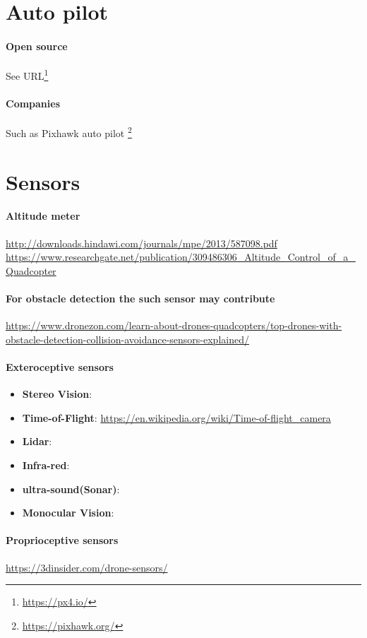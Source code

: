 \documentclass{article}
\begin{document}
	
	\section{Auto pilot}
		\paragraph{Open source } See URL\footnote{\url{https://px4.io/}}
		\paragraph{Companies}
		Such as Pixhawk auto pilot  \footnote{\url{https://pixhawk.org/}}
	\section{Sensors}
		\paragraph{Altitude meter}
		\url{http://downloads.hindawi.com/journals/mpe/2013/587098.pdf}
		\url{https://www.researchgate.net/publication/309486306_Altitude_Control_of_a_Quadcopter}
		\paragraph{For obstacle detection the such sensor may contribute}
		\url{https://www.dronezon.com/learn-about-drones-quadcopters/top-drones-with-obstacle-detection-collision-avoidance-sensors-explained/}
		\paragraph{Exteroceptive sensors}
			\begin{itemize}
				\item \textbf{Stereo Vision}:
				\item \textbf{Time-of-Flight}: \url{https://en.wikipedia.org/wiki/Time-of-flight_camera}
				\item \textbf{Lidar}:
				\item \textbf{Infra-red}:
				\item \textbf{ultra-sound(Sonar)}:
				\item \textbf{Monocular Vision}:
			\end{itemize}
		\paragraph{Proprioceptive sensors}
			\url{https://3dinsider.com/drone-sensors/}
			
\end{document}
